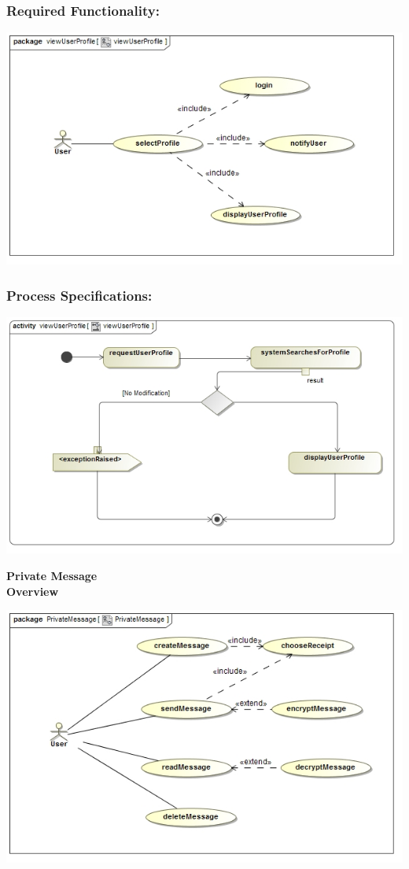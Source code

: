 \documentclass[a4paper,11pt]{article}
\begin{document}
\subsubsection{Required Functionality:} 
\includegraphics[width=1\linewidth]{./Images/UserProfile/ViewUserProfileUseCase}
\subsubsection{Process Specifications:} 
\includegraphics[width=1\linewidth]{./Images/UserProfile/ViewUserProfileActivity}

\textbf{Private Message}\\
\textbf{Overview}\\
\begin{center}
\includegraphics[width=1\linewidth]{./Images/OverviewDiagrams/PrivateMessage.jpg}\\
\end{center}
\end{document}
